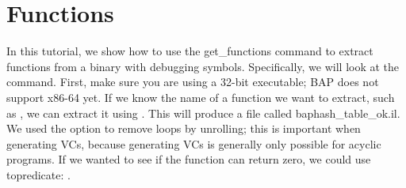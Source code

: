 \section{Functions}

In this tutorial, we show how to use the get\_functions command to
extract functions from a binary with debugging symbols.  Specifically,
we will look at the  command.  First, make sure you
are using a 32-bit executable; BAP does not support x86-64 yet.  If we
know the name of a function we want to extract, such as
, we can extract it using
.  This
will produce a file called baphash\_table\_ok.il. We used the
 option to remove loops by unrolling; this is
important when generating VCs, because generating VCs is generally
only possible for acyclic programs. If we wanted to see if the
function can return zero, we could use topredicate:
.
